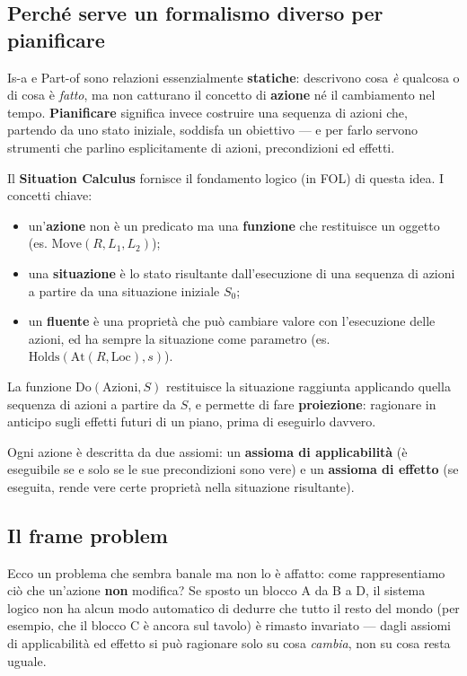 \documentclass[11pt,a4paper]{article}
\begin{document}
\subsection{Perché serve un formalismo diverso per pianificare}

Is-a e Part-of sono relazioni essenzialmente \textbf{statiche}: descrivono cosa \emph{è} qualcosa o di cosa è \emph{fatto}, ma non catturano il concetto di \textbf{azione} né il cambiamento nel tempo. \textbf{Pianificare} significa invece costruire una sequenza di azioni che, partendo da uno stato iniziale, soddisfa un obiettivo --- e per farlo servono strumenti che parlino esplicitamente di azioni, precondizioni ed effetti.

Il \textbf{Situation Calculus} fornisce il fondamento logico (in FOL) di questa idea. I concetti chiave:

\begin{itemize}
  \item un'\textbf{azione} non è un predicato ma una \textbf{funzione} che restituisce un oggetto (es. $\text{Move}(R,L_1,L_2)$);
  \item una \textbf{situazione} è lo stato risultante dall'esecuzione di una sequenza di azioni a partire da una situazione iniziale $S_0$;
  \item un \textbf{fluente} è una proprietà che può cambiare valore con l'esecuzione delle azioni, ed ha sempre la situazione come parametro (es. $\text{Holds}(\text{At}(R,\text{Loc}),s)$).
\end{itemize}

La funzione $\text{Do}(\text{Azioni},S)$ restituisce la situazione raggiunta applicando quella sequenza di azioni a partire da $S$, e permette di fare \textbf{proiezione}: ragionare in anticipo sugli effetti futuri di un piano, prima di eseguirlo davvero.

Ogni azione è descritta da due assiomi: un \textbf{assioma di applicabilità} (è eseguibile se e solo se le sue precondizioni sono vere) e un \textbf{assioma di effetto} (se eseguita, rende vere certe proprietà nella situazione risultante).

\subsection{Il frame problem}

Ecco un problema che sembra banale ma non lo è affatto: come rappresentiamo ciò che un'azione \textbf{non} modifica? Se sposto un blocco A da B a D, il sistema logico non ha alcun modo automatico di dedurre che tutto il resto del mondo (per esempio, che il blocco C è ancora sul tavolo) è rimasto invariato --- dagli assiomi di applicabilità ed effetto si può ragionare solo su cosa \emph{cambia}, non su cosa resta uguale.
\end{document}
